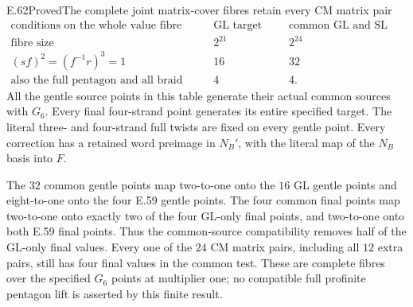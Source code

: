 \begin{statement}{E.62}{Proved}{The complete joint matrix-cover fibres retain every CM matrix pair}
\[\begin{array}{l|r|r}
 \text{conditions on the whole value fibre}&\text{GL target alone}&
                    \text{common GL and SL targets}\\\hline
 \text{fibre size}&2^{21}&2^{24}\\
 (sf)^2=(f^{-1}r)^3=1&16&32\\
 \text{also the full pentagon and all braid relations}&4&4.
 \end{array}
 \tag{E.62.6}
\]
All the gentle source points in this table generate their actual common
sources with $G_6$.  Every final four-strand point generates its entire
specified target.  The literal three- and four-strand full twists are
fixed on every gentle point.  Every correction has a retained word
preimage in $N_B'$, with the literal map of the $N_B$ basis into $F$.

The $32$ common gentle points map two-to-one onto the $16$ GL gentle
points and eight-to-one onto the four E.59 gentle points.  The four
common final points map two-to-one onto exactly two of the four GL-only
final points, and two-to-one onto both E.59 final points.  Thus the
common-source compatibility removes half of the GL-only final values.
Every one of the $24$ CM matrix pairs, including all $12$ extra pairs,
still has four final values in the common test.  These are complete
fibres over the specified $G_6$ points at multiplier one; no compatible
full profinite pentagon lift is asserted by this finite result.
\end{statement}


